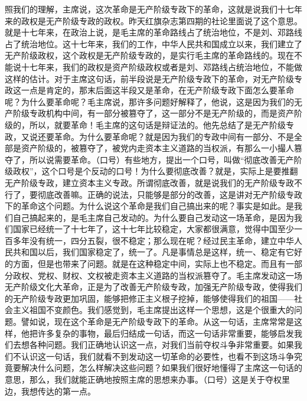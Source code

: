 \begin{maonote}
照我们的理解，主席说，这次革命是无产阶级专政下的革命，这就是说我们十七年来的政权是无产阶级专政的政权。昨天红旗杂志第四期的社论里面说了这个意思。就是十七年来，在政治上说，是毛主席的革命路线占了统治地位，不是刘、邓路线占了统治地位。这十七年来，我们的工作，中华人民共和国成立以来，我们建立了无产阶级政权，这个政权是无产阶级专政的，是实行毛主席的革命路线的。现在不能说十七年来，我们的政权是资产阶级政权或者是刘、邓路线占统治地位，不能做这样的估计。对于主席这句话，前半段说是无产阶级专政下的革命，对无产阶级专政这一点是肯定的，那末后面这半段又是革命，在无产阶级专政下面怎么要革命呢？为什么要革命呢？毛主席说，那许多问题好解释了，他说，这是因为我们的无产阶级专政机构中间，有一部分被篡夺了，这一部分不是无产阶级的，而是资产阶级的，所以，就要革命！毛主席的这句话是辩证法的。他先总结了是无产阶级专政，又说还要革命。为什么要革命呢？就是因为我们的专政中间有一部分、不是全部是资产阶级的，被篡夺了，被党内走资本主义道路的当权派，有那么一小撮人篡夺了，所以说需要革命。（口号）有些地方，提出一个口号，叫做“彻底改善无产阶级政权”，这个口号是个反动的口号！为什么要彻底改善？就是，实际上是要推翻无产阶级专政，建立资本主义专政。所谓彻底改善，就是说我们的无产阶级专政不行了，要彻底改善嘛。正确的说法，只能够是部分的改善，这是讲对无产阶级专政下的革命这个问题。为什么说这个革命是我们自己搞出来的呢？事实是如此。是我们自己搞起来的，是毛主席自己发动的。为什么要自己发动这一场革命，是因为我们国家已经统一了十七年了，这十七年比较稳定，大家都很满意，觉得中国至少一百多年没有统一，四分五裂，很不稳定；那么现在呢？经过民主革命，建立中华人民共和国以后，我们国家稳定了，统一了。凡是事情总是这样，统一、稳定有它好的方面，但是也带来了问题。就是在这种稳定中间，实际上也不稳定。而且有一部分政权、党权、财权、文权被走资本主义道路的当权派篡夺了。毛主席发动这一场无产阶级文化大革命，正是为了改善无产阶级专政，加强无产阶级专政，使得我们的无产阶级专政更加巩固，能够把修正主义根子挖掉，能够使得我们的祖国——社会主义祖国不变颜色。我们感觉到，毛主席提出这样一个思想，这是个很重大的问题。譬如说，现在这个革命是无产阶级专政下的革命。从这一句话，主席常常是这样，他把许多复杂的事物，最后归结成一句话，而这一句话非常重要，能够启发我们去想各种问题。我们正确地认识这一点，对我们当前夺权斗争非常重要。如果我们不认识这一句话，我们就看不到发动这一切革命的必要性，也看不到这场斗争究竟要解决什么问题，怎么样解决这些问题？如果我们很好地懂得了主席这一句话的意思，那么，我们就能正确地按照主席的思想来办事。（口号）这是关于夺权里边，我想传达的第一点。

\end{maonote}
